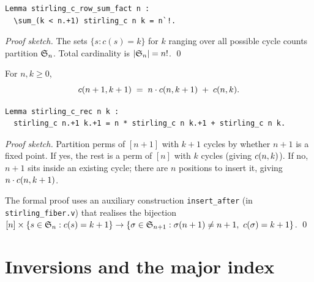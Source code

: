 \begin{lstlisting}[language=Rocq]
Lemma stirling_c_row_sum_fact n :
  \sum_(k < n.+1) stirling_c n k = n`!.
\end{lstlisting}


\noindent
\emph{Proof sketch.} The sets $\{s : c(s) = k\}$ for $k$ ranging
over all possible cycle counts partition $\mathfrak{S}_{n}$. Total
cardinality is $|\mathfrak{S}_{n}| = n!$. \qed

\begin{theorem}
  \label{thm:stirling_c_rec}
  For $n, k \geq 0$,
  \[
    c(n+1, k+1) \;=\; n \cdot c(n, k+1) \;+\; c(n, k).
  \]
\end{theorem}

\begin{lstlisting}[language=Rocq]
Lemma stirling_c_rec n k :
  stirling_c n.+1 k.+1 = n * stirling_c n k.+1 + stirling_c n k.
\end{lstlisting}


\noindent
\emph{Proof sketch.} Partition perms of $[n+1]$ with $k+1$ cycles
by whether $n+1$ is a fixed point. If yes, the rest is a perm of
$[n]$ with $k$ cycles (giving $c(n, k)$). If no, $n+1$
sits inside an existing cycle; there are $n$ positions to insert
it, giving $n \cdot c(n, k+1)$.

The formal proof uses an auxiliary construction
\texttt{insert\_after} (in \texttt{stirling\_fiber.v}) that
realises the bijection
$[n] \times \{s \in \mathfrak{S}_{n} : c(s) = k+1\} \to
\{\sigma \in \mathfrak{S}_{n+1} : \sigma(n+1) \neq n+1,\ c(\sigma) = k+1\}$. \qed

\clearpage

\chapter{Inversions and the major index}
\label{ch:inversions}

